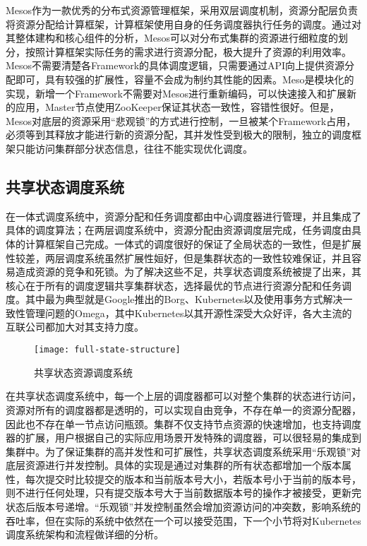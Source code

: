 Mesos作为一款优秀的分布式资源管理框架，采用双层调度机制，资源分配层负责将资源分配给计算框架，计算框架使用自身的任务调度器执行任务的调度。通过对其整体建构和核心组件的分析，Mesos可以对分布式集群的资源进行细粒度的划分，按照计算框架实际任务的需求进行资源分配，极大提升了资源的利用效率。Mesos不需要清楚各Framework的具体调度逻辑，只需要通过API向上提供资源分配即可，具有较强的扩展性，容量不会成为制约其性能的因素。Meso是模块化的实现，新增一个Framework不需要对Mesos进行重新编码，可以快速接入和扩展新的应用，Master节点使用ZooKeeper保证其状态一致性，容错性很好。但是，Mesos对底层的资源采用“悲观锁”的方式进行控制，一旦被某个Framework占用，必须等到其释放才能进行新的资源分配，其并发性受到极大的限制，独立的调度框架只能访问集群部分状态信息，往往不能实现优化调度。
\subsection{共享状态调度系统}
在一体式调度系统中，资源分配和任务调度都由中心调度器进行管理，并且集成了具体的调度算法；在两层调度系统中，资源分配由资源调度层完成，任务调度由具体的计算框架自己完成。一体式的调度很好的保证了全局状态的一致性，但是扩展性较差，两层调度系统虽然扩展性姮好，但是集群状态的一致性较难保证，并且容易造成资源的竞争和死锁。为了解决这些不足，共享状态调度系统被提了出来，其核心在于所有的调度逻辑共享集群状态，选择最优的节点进行资源分配和任务调度。其中最为典型就是Google推出的Borg、Kubernetes以及使用事务方式解决一致性管理问题的Omega，其中Kubernetes以其开源性深受大众好评，各大主流的互联公司都加大对其支持力度。

\begin{figure}[H] %
	\centering
	\texttt{[image: full-state-structure]}
	\caption{共享状态资源调度系统}
\end{figure}
在共享状态调度系统中，每一个上层的调度器都可以对整个集群的状态进行访问，资源对所有的调度器都是透明的，可以实现自由竞争，不存在单一的资源分配器，因此也不存在单一节点访问瓶颈。集群不仅支持节点资源的快速增加，也支持调度器的扩展，用户根据自己的实际应用场景开发特殊的调度器，可以很轻易的集成到集群中。为了保证集群的高并发性和可扩展性，共享状态调度系统采用“乐观锁”对底层资源进行并发控制。具体的实现是通过对集群的所有状态都增加一个版本属性，每次提交时比较提交的版本和当前版本号大小，若版本号小于当前的版本号，则不进行任何处理，只有提交版本号大于当前数据版本号的操作才被接受，更新完状态后版本号递增。“乐观锁”并发控制虽然会增加资源访问的冲突数，影响系统的吞吐率，但在实际的系统中依然在一个可以接受范围，下一个小节将对Kubernetes调度系统架构和流程做详细的分析。

